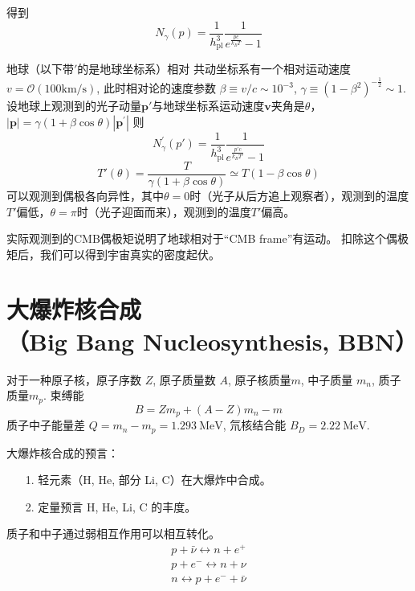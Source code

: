 \documentclass[]{ctexart}
\begin{document}
得到 
\begin{equation}
    N_\gamma(p) = \frac{1}{h_{\mathrm{pl}}^3} \frac{1}{e^\frac{pc}{k_B T}-1}
\end{equation}

地球（以下带$'$的是地球坐标系）相对 共动坐标系有一个相对运动速度
$v = \mathcal{O} \left(100 \mathrm{km/s}\right) $, 
此时相对论的速度参数
$\beta \equiv v/c\sim 10^{-3}$,
$\gamma \equiv \left(1-\beta^2\right)^{-\frac{1}{2}}\sim 1$. 
设地球上观测到的光子动量$\boldsymbol{p'}$与地球坐标系运动速度$\boldsymbol{v}$夹角是$\theta$，$|\boldsymbol{p}| =\gamma \left(1+\beta \cos \theta \right) |\boldsymbol{p^\prime}|$
则
\begin{equation}
    N_\gamma^\prime(p') = \frac{1}{h_{\mathrm{pl}}^3} \frac{1}{e^\frac{p'c}{k_B T'}-1}
\end{equation}
\begin{equation}
    T'\left(\theta\right) = \frac{T}{\gamma \left(1+\beta \cos \theta\right) } \simeq T\left(1-\beta \cos \theta\right) 
\end{equation}
可以观测到偶极各向异性，其中$\theta=0$时（光子从后方追上观察者），观测到的温度$T'$偏低，$\theta=\pi$时（光子迎面而来），观测到的温度$T'$偏高。

实际观测到的CMB偶极矩说明了地球相对于“CMB frame”有运动。
扣除这个偶极矩后，我们可以得到宇宙真实的密度起伏。


\section{大爆炸核合成 \\（Big Bang Nucleosynthesis, BBN）}

对于一种原子核，原子序数 $Z$,
原子质量数 $A$, 原子核质量$m$, 中子质量 $m_n$, 质子质量$m_p$.
束缚能
\begin{equation}
    B=Z m_p + (A-Z) m_n -m
\end{equation}
质子中子能量差 $Q=m_n-m_p = 1.293 \mathrm{~MeV}$,
氘核结合能 $B_D = 2.22 \mathrm{~MeV} $.

大爆炸核合成的预言：
\begin{itemize}
    \item[1.] 轻元素（H, He, 部分 Li, C）在大爆炸中合成。
    \item[2.] 定量预言 H, He, Li, C 的丰度。
\end{itemize}

质子和中子通过弱相互作用可以相互转化。
\begin{eqnarray}
    p+\bar{\nu} \leftrightarrow n + e^+ \\ 
    p + e^- \leftrightarrow n + \nu \\ 
    n \leftrightarrow p + e^- + \bar{\nu}
\end{eqnarray}
\end{document}
